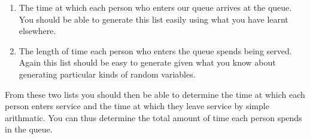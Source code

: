 \documentclass[paper=a4, fontsize=11pt]{scrartcl}
\numberwithin{equation}{section}
\numberwithin{figure}{section}
\numberwithin{table}{section}
\begin{document}
\begin{enumerate}
\item The time at which each person who enters our queue arrives at the queue.  You should be able to generate this list easily using what you have learnt elsewhere.

\item The length of time each person who enters the queue spends being served.  Again this list should be easy to generate given what you know about generating particular kinds of random variables.
\end{enumerate}

From these two lists you should then be able to determine the time at which each person enters service and the time at which they leave service by simple arithmatic.  You can thus determine the total amount of time each person spends in the queue.
\end{document}
